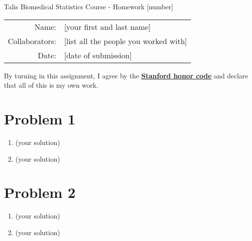 \documentclass[12pt]{article}
\begin{document}
\begin{center}
{\Large Talis Biomedical Statistics Course - Homework [number]}
\newline

\begin{tabular}{rl}
  Name: & [your first and last name] \\
  Collaborators: & [list all the people you worked with] \\
  Date: & [date of submission]
\end{tabular}
\end{center}

By turning in this assignment, I agree by the \textbf{\href{https://communitystandards.stanford.edu/policies-and-guidance/honor-code}{Stanford honor code}} and declare
that all of this is my own work.

\section*{Problem 1}

\begin{enumerate}[label=(\alph*)]
  \item (your solution)
  \item (your solution)
\end{enumerate}

\section*{Problem 2}

\begin{enumerate}[label=(\alph*)]
  \item (your solution)
  \item (your solution)
\end{enumerate}
\end{document}
